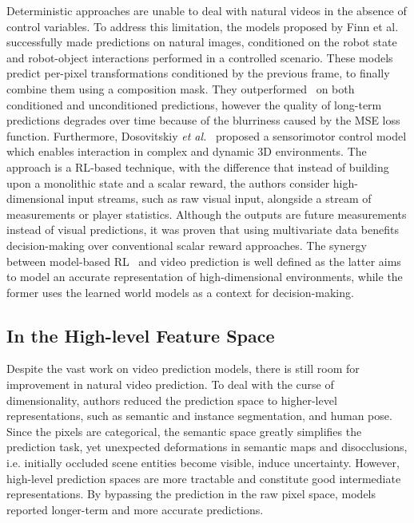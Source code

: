 Deterministic approaches are unable to deal with natural videos in the absence of control variables. To address this limitation, the models proposed by Finn et al.~\cite{Finn2016} successfully made predictions on natural images, conditioned on the robot state and robot-object interactions performed in a controlled scenario. These models predict per-pixel transformations conditioned by the previous frame, to finally combine them using a composition mask. They outperformed~\cite{Oh2015,Mathieu2016} on both conditioned and unconditioned predictions, however the quality of long-term predictions degrades over time because of the blurriness caused by the \ac{MSE} loss function. Furthermore, Dosovitskiy \textit{et al.}~\cite{Dosovitskiy2017} proposed a sensorimotor control model which enables interaction in complex and dynamic \ac{3D} environments. The approach is a \ac{RL}-based technique, with the difference that instead of building upon a monolithic state and a scalar reward, the authors consider high-dimensional input streams, such as raw visual input, alongside a stream of measurements or player statistics. Although the outputs are future measurements instead of visual predictions, it was proven that using multivariate data benefits decision-making over conventional scalar reward approaches. The synergy between model-based \ac{RL}~\cite{Hafner2019,Kaiser2020,Hafner2020} and video prediction is well defined as the latter aims to model an accurate representation of high-dimensional environments, while the former uses the learned world models as a context for decision-making.

\subsection{In the High-level Feature Space}
\label{subsec:m_high_level}
Despite the vast work on video prediction models, there is still room for improvement in natural video prediction. To deal with the curse of dimensionality, authors reduced the prediction space to higher-level representations, such as semantic and instance segmentation, and human pose. Since the pixels are categorical, the semantic space greatly simplifies the prediction task, yet unexpected deformations in semantic maps and disocclusions, i.e. initially occluded scene entities become visible, induce uncertainty.
However, high-level prediction spaces are more tractable and constitute good intermediate representations. By bypassing the prediction in the raw pixel space, models reported longer-term and more accurate predictions.

